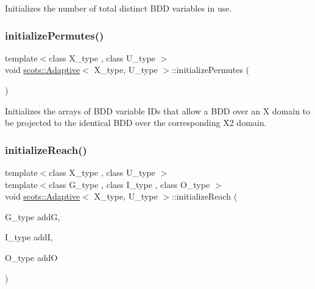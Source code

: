 Initializes the number of total distinct B\+DD variables in use. \mbox{\label{classscots_1_1Adaptive_a7351461977b9be0f07ec2974531af677}} 
\subsubsection{\texorpdfstring{initialize\+Permutes()}{initializePermutes()}}
{\footnotesize\ttfamily template$<$class X\+\_\+type , class U\+\_\+type $>$ \\
void \hyperlink{classscots_1_1Adaptive}{scots\+::\+Adaptive}$<$ X\+\_\+type, U\+\_\+type $>$\+::initialize\+Permutes (\begin{DoxyParamCaption}{ }\end{DoxyParamCaption})\hspace{0.3cm}{\ttfamily [inline]}}

Initializes the arrays of B\+DD variable I\+Ds that allow a B\+DD over an X domain to be projected to the identical B\+DD over the corresponding X2 domain. \mbox{\label{classscots_1_1Adaptive_a63afb68f37f6140095c2460d07fc19cb}} 
\subsubsection{\texorpdfstring{initialize\+Reach()}{initializeReach()}}
{\footnotesize\ttfamily template$<$class X\+\_\+type , class U\+\_\+type $>$ \\
template$<$class G\+\_\+type , class I\+\_\+type , class O\+\_\+type $>$ \\
void \hyperlink{classscots_1_1Adaptive}{scots\+::\+Adaptive}$<$ X\+\_\+type, U\+\_\+type $>$\+::initialize\+Reach (\begin{DoxyParamCaption}\item[{G\+\_\+type}]{addG,  }\item[{I\+\_\+type}]{addI,  }\item[{O\+\_\+type}]{addO }\end{DoxyParamCaption})\hspace{0.3cm}{\ttfamily [inline]}}


